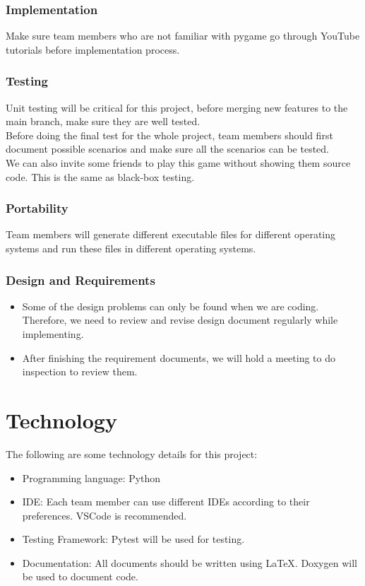\documentclass[12pt]{article}
\begin{document}
\subsubsection{Implementation}
Make sure team members who are not familiar 
with pygame go through YouTube tutorials
before implementation process.
\subsubsection{Testing}
Unit testing will be critical for this project, before merging new features to the 
main branch, make sure they are well tested.\\
Before doing the final test for the whole
project, team members should first document
possible scenarios and make sure all the 
scenarios can be tested.\\
We can also invite some friends to play 
this game without showing them source code.
This is the same as black-box testing. 
\subsubsection{Portability}
Team members will generate different executable
files for different operating systems and run these files in different operating systems.
\subsubsection{Design and Requirements}
\begin{itemize}
\item Some of the design problems can only
be found when we are coding. Therefore, 
we need to review and revise design document regularly while implementing.
\item After finishing the requirement documents, we
will hold a meeting to do inspection to review them. 
\end{itemize}
\section{Technology}
The following are some technology details 
for this project:
\begin{itemize}
\item Programming language: Python
\item IDE: Each team member can use different IDEs according to their preferences. VSCode is recommended.
\item Testing Framework: Pytest will be 
used for testing.
\item Documentation: All documents should
be written using \LaTeX. Doxygen will be 
used to document code. 
\end{itemize}
\end{document}
